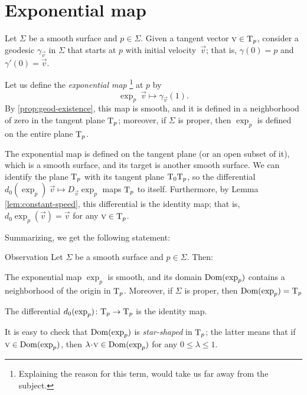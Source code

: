 \section{Exponential map}\label{sec:exp}

Let $\Sigma$ be a smooth surface and $p\in \Sigma$.
Given a tangent vector ${\text{\sc{v}}}\in \mathrm{T}_p$, consider a geodesic $\gamma_{\vec v}$ in $\Sigma$ that starts at $p$ with initial velocity~$\vec v$; 
that is, $\gamma(0)=p$ and $\gamma'(0)={\vec v}$.

Let us define the \emph{exponential map}%
\footnote{Explaining the reason for this term, would take us far away from the subject.}
at $p$ by
\[\exp_p\:\vec v\mapsto \gamma_{\vec v}(1).\]
By \ref{prop:geod-existence}, this map is smooth, and it is defined in a neighborhood of zero in the tangent plane $\mathrm{T}_p$;
moreover, if $\Sigma$ is proper, 
then $\exp_p$ is defined on the entire plane $\mathrm{T}_p$.

The exponential map
is defined on the tangent plane (or an open subset of it), which is a smooth surface,
and its target is another smooth surface.
We can identify the plane $\mathrm{T}_p$
with its tangent plane $\mathrm{T}_0\mathrm{T}_p$, so the differential $d_0(\exp_p)\:\vec v\mapsto D_{\vec v}\exp_p$ maps $\mathrm{T}_p$ to itself.
Furthermore, by Lemma \ref{lem:constant-speed}, this differential is the identity map; that is, $d_0\exp_p(\vec v)=
\vec v$ for any $\text{\sc{v}}\in \mathrm{T}_p$.

Summarizing, we get the following statement:

\begin{thm}{Observation}\label{obs:d(exp)=1}
Let $\Sigma$ be a smooth surface and $p\in \Sigma$.
Then:

\begin{subthm}{}
The exponential map $\exp_p$ is smooth, and its domain $\mathop{\rm Dom}\nolimits(\exp_p)$ contains a neighborhood of the origin in $\mathrm{T}_p$.
Moreover, if $\Sigma$ is proper, then $\mathop{\rm Dom}\nolimits(\exp_p)=\mathrm{T}_p$
\end{subthm}

\begin{subthm}{}
The differential $d_0(\exp_p)\colon\mathrm{T}_p\to \mathrm{T}_p$ is the identity map.
\end{subthm}

\end{thm}

It is easy to check that $\mathop{\rm Dom}\nolimits(\exp_p)$ is \emph{star-shaped} in $\mathrm{T}_p$;
the latter means that if $\text{\sc{v}}\in \mathop{\rm Dom}\nolimits(\exp_p)$, then $\lambda\cdot\vec v\in \Dom(\exp_p)$ for any $0\le \lambda\le 1$.


